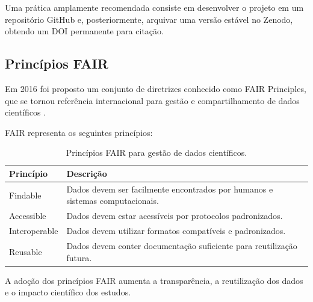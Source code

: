 Uma prática amplamente recomendada consiste em desenvolver o projeto em um
repositório GitHub e, posteriormente, arquivar uma versão estável no Zenodo,
obtendo um DOI permanente para citação.

\subsection{Princípios FAIR}

Em 2016 foi proposto um conjunto de diretrizes conhecido como FAIR Principles,
que se tornou referência internacional para gestão e compartilhamento de dados
científicos \citep{wilkinson2016fair}.

FAIR representa os seguintes princípios:

\begin{table}[H]
	\centering
	\caption{Princípios FAIR para gestão de dados científicos.}
	\label{tab:fair_principles}
	
	\begin{tabular}{
			p{}
			p{}
		}
		
		\toprule
		
		\textbf{Princípio} &
		\textbf{Descrição}
		
		\\
		\midrule
		
		Findable &
		Dados devem ser facilmente encontrados por humanos e sistemas computacionais.
		
		\\
		
		Accessible &
		Dados devem estar acessíveis por protocolos padronizados.
		
		\\
		
		Interoperable &
		Dados devem utilizar formatos compatíveis e padronizados.
		
		\\
		
		Reusable &
		Dados devem conter documentação suficiente para reutilização futura.
		
		\\
		
		\bottomrule
		
	\end{tabular}
	
\end{table}

A adoção dos princípios FAIR aumenta a transparência, a reutilização dos dados
e o impacto científico dos estudos.

